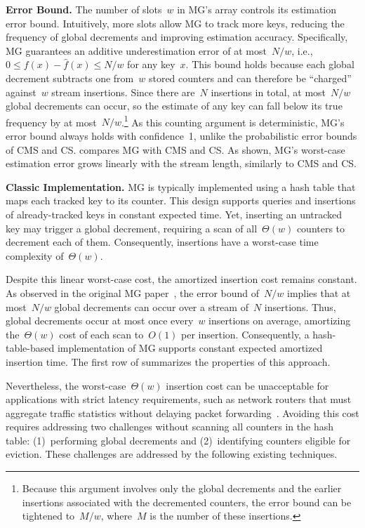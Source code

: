 \documentclass[sigconf]{acmart}
\begin{document}
\textbf{Error Bound.}
The number of slots~$w$ in MG's array controls its estimation error bound.
Intuitively, more slots allow MG to track more keys, reducing the frequency of global decrements and improving estimation accuracy.
Specifically, MG guarantees an additive underestimation error of at most~$N/w$, i.e., $0 \leq f(x)-\hat{f}(x) \leq N/w$ for any key~$x$.
This bound holds because each global decrement subtracts one from~$w$ stored counters and can therefore be ``charged'' against~$w$ stream insertions.
Since there are~$N$ insertions in total, at most~$N/w$ global decrements can occur, so the estimate of any key can fall below its true frequency by at most~$N/w$.\footnote{
    Because this argument involves only the global decrements and the earlier insertions associated with the decremented counters, the error bound can be tightened to~$M/w$, where~$M$ is the number of these insertions.
}
As this counting argument is deterministic, MG's error bound always holds with confidence~1, unlike the probabilistic error bounds of CMS and CS.
 compares MG with CMS and CS.
As shown, MG's worst-case estimation error grows linearly with the stream length, similarly to CMS and CS.

\textbf{Classic Implementation.}
MG is typically implemented using a hash table that maps each tracked key to its counter.
This design supports queries and insertions of already-tracked keys in constant expected time.
Yet, inserting an untracked key may trigger a global decrement, requiring a scan of all~$\Theta(w)$ counters to decrement each of them.
Consequently, insertions have a worst-case time complexity of~$\Theta(w)$.

Despite this linear worst-case cost, the amortized insertion cost remains constant.
As observed in the original MG paper~\cite{MisraGries}, the error bound of~$N/w$ implies that at most~$N/w$ global decrements can occur over a stream of~$N$ insertions.
Thus, global decrements occur at most once every~$w$ insertions on average, amortizing the~$\Theta(w)$ cost of each scan to~$O(1)$ per insertion.
Consequently, a hash-table-based implementation of MG supports constant expected amortized insertion time.
The first row of  summarizes the properties of this approach.

Nevertheless, the worst-case~$\Theta(w)$ insertion cost can be unacceptable for applications with strict latency requirements, such as network routers that must aggregate traffic statistics without delaying packet forwarding~\cite{UnivMon,StingySketch}.
Avoiding this cost requires addressing two challenges without scanning all counters in the hash table: (1)~performing global decrements and (2)~identifying counters eligible for eviction.
These challenges are addressed by the following existing techniques.
\end{document}
